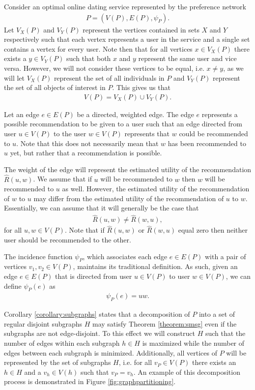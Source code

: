 Consider an optimal online dating service represented by the preference network
\begin{align*}
    P = (V(P), E(P), \psi_{P}). 
\end{align*}
Let $V_{X}(P)$ and $V_{Y}(P)$ represent the vertices contained in sets $X$ and $Y$ respectively such that each vertex represents a user in the service and a single set contains a vertex for every user. Note then that for all vertices $x \in V_{X}(P)$ there exists a $y \in V_{Y}(P)$ such that both $x$ and $y$ represent the same user and vice versa. However, we will not consider these vertices to be equal, i.e. $x \neq y$, as we will let $V_{X}(P)$ represent the set of all individuals in $P$ and $V_{Y}(P)$ represent the set of all objects of interest in $P$. This gives us that
\begin{align*}
    V(P) = V_{X}(P) \cup V_{Y}(P).
\end{align*}

Let an edge $e \in E(P)$ be a directed, weighted edge. The edge $e$ represents a possible recommendation to be given to a user such that an edge directed from user $u \in V(P)$ to the user $w \in V(P)$ represents that $w$ could be recommended to $u$. Note that this does not necessarily mean that $w$ has been recommended to $u$ yet, but rather that a recommendation is possible. 

The weight of the edge will represent the estimated utility of the recommendation $\hat{R}(u, w)$. We assume that if $u$ will be recommended to $w$ then $w$ will be recommended to $u$ as well. However, the estimated utility of the recommendation of $w$ to $u$ may differ from the estimated utility of the recommendation of $u$ to $w$. Essentially, we can assume that it will generally be the case that
\begin{align*}
    \hat{R}(u, w) \neq \hat{R}(w, u),
\end{align*}
for all $u, w \in V(P)$. Note that if $\hat{R}(u, w)$ or $\hat{R}(w, u)$ equal zero then neither user should be recommended to the other.

The incidence function $\psi_{P}$, which associates each edge $e \in E(P)$ with a pair of vertices $v_{1}, v_{2} \in V(P)$, maintains its traditional definition. As such, given an edge $e \in E(P)$ that is directed from user $u \in V(P)$ to user $w \in V(P)$, we can define $\psi_{P}(e)$ as
\begin{align*}
\psi_{P}(e) = uw. 
\end{align*}

Corollary \ref{corollary:subgraphs} states that a decomposition of $P$ into a set of regular disjoint subgraphs $H$ may satisfy Theorem \ref{theorem:smsg} even if the subgraphs are not edge-disjoint. To this effect we will construct $H$ such that the number of edges within each subgraph $h \in H$ is maximized while the number of edges between each subgraph is minimized. Additionally, all vertices of $P$ will be represented by the set of subgraphs $H$, i.e. for all $v_{P} \in V(P)$ there exists an $h \in H$ and a $v_{h} \in V(h)$ such that $v_{P} = v_{h}$. An example of this decomposition process is demonstrated in Figure \ref{fig:graphpartitioning}.


